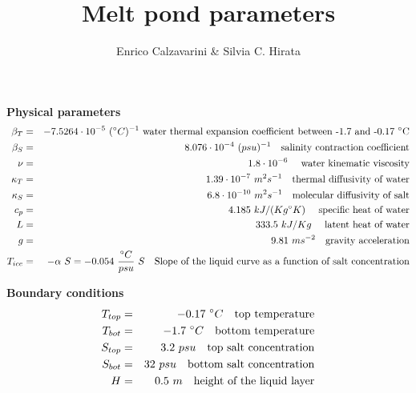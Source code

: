 \documentclass[onecolumn]{revtex4}
\begin{document}
\title{Melt pond parameters}
\author{Enrico Calzavarini \& Silvia C. Hirata}
\maketitle


\textbf{Physical parameters}\\
\begin{eqnarray}
\beta_T &=& -7.5264 \cdot 10^{-5}\ (\degree C)^{-1} \textrm{ water thermal expansion coefficient between -1.7 and -0.17 \degree C}\\
\beta_S &=& 8.076 \cdot 10^{-4}\ (psu)^{-1} \quad \textrm{salinity contraction coefficient}\\ 
\nu &=&  1.8 \cdot 10^{-6}\quad  \textrm{ water kinematic viscosity} \\
\kappa_T &=& 1.39 \cdot 10^{-7}\ m^2 s^{-1}  \quad \textrm{thermal diffusivity of water} \\
\kappa_S &=& 6.8 \cdot 10^{-10}\  m^2 s^{-1} \quad \textrm{molecular diffusivity of salt}\\
c_p &=& 4.185\ kJ/ (Kg \degree K)\ \quad \textrm{specific heat of water}\\
L &=& 333.5\ kJ/Kg \ \quad \textrm{latent heat of water}\\
g &=& 9.81\ m s^{-2} \quad \textrm{gravity acceleration}\\
T_{ice} &=& - \alpha\ S = -0.054\  \frac{\degree C}{psu} \ S \quad  \textrm{Slope of the liquid curve as a function of salt concentration}\\
\end{eqnarray}

\textbf{Boundary conditions}\\ 
\begin{eqnarray}
T_{top} &=& -0.17\ \degree C \quad  \textrm{top temperature} \\
T_{bot} &=& -1.7\ \degree C  \quad  \textrm{bottom temperature} \\
S_{top} &=& 3.2\ psu  \quad  \textrm{top salt concentration} \\
S_{bot} &=& 32\ psu  \quad  \textrm{bottom salt concentration} \\
H &=&  0.5\ m \quad  \textrm{height of the liquid layer}\\
\end{eqnarray}
\end{document}
